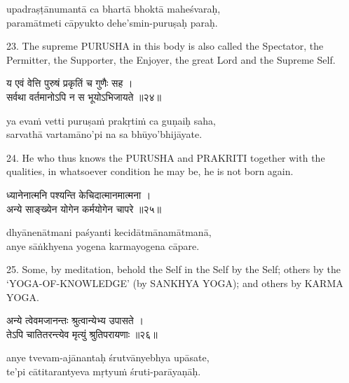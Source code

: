 \begin{transliteration}
upadraṣṭānumantā ca bhartā bhoktā maheśvaraḥ, \\
paramātmeti cāpyukto dehe'smin-puruṣaḥ paraḥ.
\end{transliteration}

23. The supreme PURUSHA in this body is also called the Spectator, the
Permitter, the Supporter, the Enjoyer, the great Lord and the Supreme Self.

\begin{gitaverse}
य एवं वेत्ति पुरुषं प्रकृतिं च गुणैः सह । \\
सर्वथा वर्तमानोऽपि न स भूयोऽभिजायते ॥२४॥
\end{gitaverse}

\begin{transliteration}
ya evaṁ vetti puruṣaṁ prakṛtiṁ ca guṇaiḥ saha, \\
sarvathā vartamāno'pi na sa bhūyo'bhijāyate.
\end{transliteration}

24. He who thus knows the PURUSHA and PRAKRITI together with the qualities, in
whatsoever condition he may be, he is not born again.

\begin{gitaverse}
ध्यानेनात्मनि पश्यन्ति केचिदात्मानमात्मना । \\
अन्ये साङ्ख्येन योगेन कर्मयोगेन चापरे ॥२५॥
\end{gitaverse}

\begin{transliteration}
dhyānenātmani paśyanti kecidātmānamātmanā, \\
anye sāṅkhyena yogena karmayogena cāpare.
\end{transliteration}

25. Some, by meditation, behold the Self in the Self by the Self; others by the
`YOGA-OF-KNOWLEDGE' (by SANKHYA YOGA); and others by KARMA YOGA.\@

\begin{gitaverse}
अन्ये त्वेवमजानन्तः श्रुत्वान्येभ्य उपासते । \\
तेऽपि चातितरन्त्येव मृत्युं श्रुतिपरायणाः ॥२६॥
\end{gitaverse}

\begin{transliteration}
anye tvevam-ajānantaḥ śrutvānyebhya upāsate, \\
te'pi cātitarantyeva mṛtyuṁ śruti-parāyaṇāḥ.
\end{transliteration}

